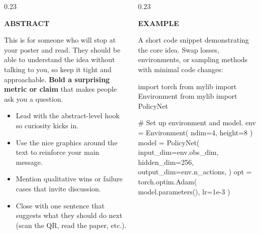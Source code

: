 \documentclass[final]{beamer}
\newcommand{\SectionHeading}[1]{\fontsize{50}{60}\selectfont\bfseries #1}
\begin{document}
\begin{frame}[t,fragile]
\begin{columns}[t,totalwidth=\textwidth]
\begin{column}{0.23\paperwidth}
            \begin{tcolorbox}[posterbox]
                {\SectionHeading{ABSTRACT}}
                \vspace{0.5em}

                This is for someone who will stop at your poster and read. They should be able
                to understand the idea without talking to you, so keep it tight and approachable.
                \textbf{Bold a surprising metric or claim} that makes people ask you a question.

                \vspace{1cm}
                \begin{itemize}
                    \item Lead with the abstract-level hook so curiosity kicks in.
                    \item Use the nice graphics around the text to reinforce your main message.
                    \item Mention qualitative wins or failure cases that invite discussion.
                    \item Close with one sentence that suggests what they should do next (scan the QR, read the paper, etc.).
                \end{itemize}
            \end{tcolorbox}

        \end{column}

        \begin{column}{0.23\paperwidth}

            \begin{tcolorbox}[posterbox]
                {\SectionHeading{EXAMPLE}}
                \vspace{0.5em}

                A short code snippet demonstrating the core idea. Swap losses, environments,
                or sampling methods with minimal code changes:

\vspace{1cm}
\begin{python}
import torch
from mylib import Environment
from mylib import PolicyNet

# Set up environment and model.
env = Environment(
    ndim=4, height=8
)
model = PolicyNet(
    input_dim=env.obs_dim,
    hidden_dim=256,
    output_dim=env.n_actions,
)
opt = torch.optim.Adam(
    model.parameters(), lr=1e-3
)


\end{python}
\end{tcolorbox}
\end{column}
\end{columns}
\end{frame}
\end{document}
